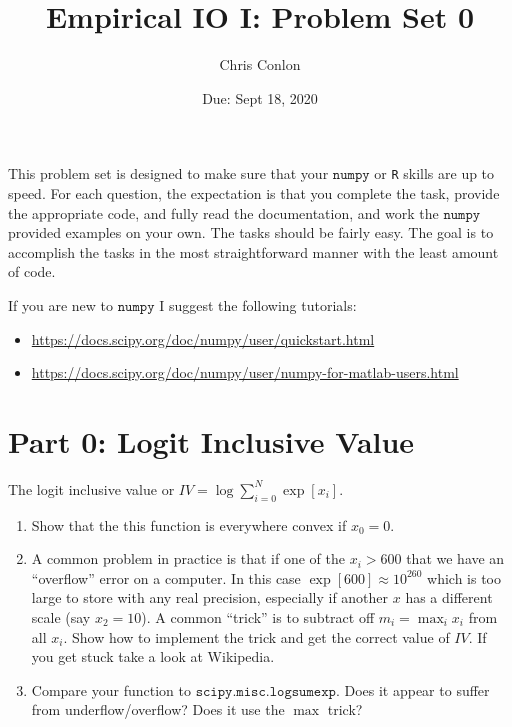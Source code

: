 \documentclass{article}
\begin{document}
\title{Empirical IO I: Problem Set 0} 
\author{Chris Conlon}
\date{Due: Sept 18, 2020}
\maketitle
This problem set is designed to make sure that your $\mathtt{numpy}$ or \texttt{R} skills are up to speed. For each question, the expectation is that you complete the task, provide the appropriate code, and fully read the documentation, and work the $\mathtt{numpy}$ provided examples on your own.  The tasks should be fairly easy.  The goal is to accomplish the tasks in the most straightforward manner with the least amount of code.  

If you are new to $\mathtt{numpy}$ I suggest the following tutorials:
\begin{itemize}
\item \url{https://docs.scipy.org/doc/numpy/user/quickstart.html}
\item  \url{https://docs.scipy.org/doc/numpy/user/numpy-for-matlab-users.html}
\end{itemize}

\section*{Part 0: Logit Inclusive Value}
The logit inclusive value or $IV = \log \sum_{i=0}^N \exp[x_i]$.
\begin{enumerate}
\item Show that the this function is everywhere convex if $x_0=0$.
\item A common problem in practice is that if one of the $x_i > 600$ that we have an ``overflow'' error on a computer. In this case $\exp[600] \approx 10^{260}$ which is too large to store with any real precision, especially if another $x$ has a different scale (say $x_2=10$). A common ``trick'' is to subtract off $m_i = \max_i x_i$ from all $x_i$.  Show how to implement the trick and get the correct value of $IV$. If you get stuck take a look at Wikipedia.
\item Compare your function to $\mathtt{scipy.misc.logsumexp}$. Does it appear to suffer from underflow/overflow? Does it use the $\max$ trick?
\end{enumerate}
\end{document}
